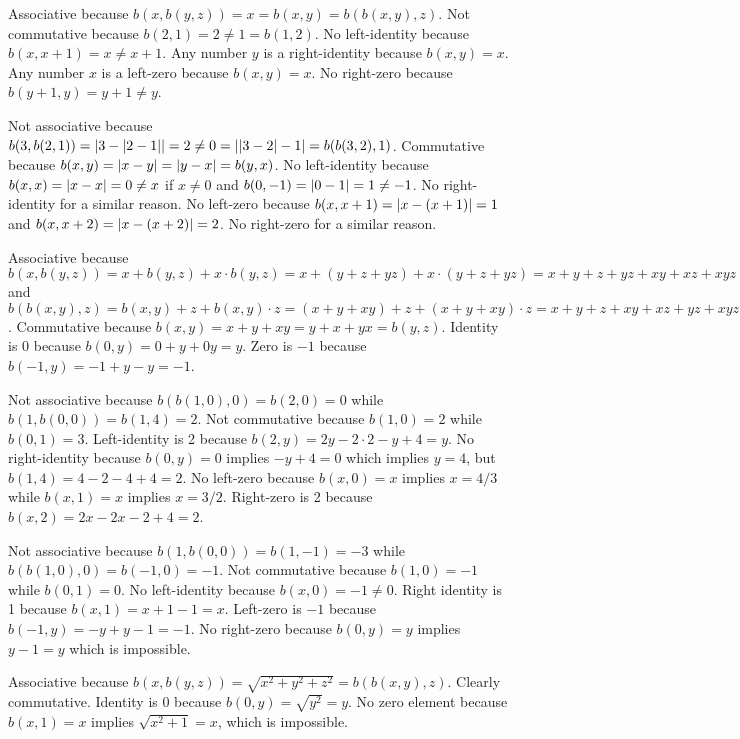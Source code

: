 \begin{solution}
\begin{enumalpha}
    \item Associative because $b(x,b(y,z))=x=b(x,y)=b(b(x,y),z)$.
    Not commutative because $b(2,1)=2\neq 1=b(1,2)$.
    No left-identity because $b(x,x+1)=x\neq x+1$.
    Any number $y$ is a right-identity because $b(x,y)=x$.
    Any number $x$ is a left-zero because $b(x,y)=x$.
    No right-zero because $b(y+1,y)=y+1\neq y$.

    \item Not associative because $b(3,b(2,1)) = \left\lvert3-\left\lvert2-1\right\rvert\right\rvert=2\neq0=\left\lvert\left\lvert3-2\right\rvert-1\right\rvert=b(b(3,2),1)$.
    Commutative because $b(x,y)=\left\lvert x-y\right\rvert=\left\lvert y-x\right\rvert=b(y,x)$.
    No left-identity because $b(x,x)=\left\lvert x-x\right\rvert=0\neq x$ if $x\neq 0$ and $b(0,-1)=\left\lvert0-1\right\rvert=1\neq -1$.
    No right-identity for a similar reason.
    No left-zero because $b(x,x+1)=\left\lvert x-(x+1)\right\rvert=1$ and $b(x,x+2)=\left\lvert x-(x+2)\right\rvert=2$.
    No right-zero for a similar reason.

    \item Associative because $b(x,b(y,z))=x+b(y,z)+x\cdot b(y,z)=x+(y+z+yz)+x\cdot(y+z+yz)
    =x+y+z+yz+xy+xz+xyz$ and $b(b(x,y),z)=b(x,y) + z + b(x,y)\cdot z=(x+y+xy) + z + (x+y+xy)\cdot z
    =x + y + z + xy + xz + yz + xyz$.
    Commutative because $b(x,y)=x+y+xy=y+x+yx=b(y,z)$.
    Identity is 0 because $b(0,y)=0+y+0y=y$.
    Zero is $-1$ because $b(-1,y)=-1+y-y=-1$.

    \item Not associative because $b(b(1,0),0)=b(2,0)=0$ while $b(1,b(0,0))
    =b(1,4)=2$.
    Not commutative because $b(1,0)=2$ while $b(0,1)=3$.
    Left-identity is 2 because $b(2,y)=2y-2\cdot 2 - y + 4 = y$.
    No right-identity because $b(0,y)=0$ implies $-y+4=0$ which implies $y=4$, but $b(1,4)=4-2-4+4=2$.
    No left-zero because $b(x,0)=x$ implies $x=4/3$ while $b(x,1)=x$ implies $x=3/2$.
    Right-zero is 2 because $b(x,2)=2x-2x-2+4=2$.

    \item Not associative because $b(1,b(0,0))=b(1,-1)=-3$ while $b(b(1,0),0)=b(-1,0)=-1$.
    Not commutative because $b(1,0)=-1$ while $b(0,1)=0$.
    No left-identity because $b(x,0)=-1\neq 0$.
    Right identity is 1 because $b(x,1)=x+1-1=x$.
    Left-zero is $-1$ because $b(-1,y)=-y+y-1=-1$.
    No right-zero because $b(0,y)=y$ implies $y-1=y$ which is impossible.

    \item Associative because
    $b(x,b(y,z))=\sqrt{x^2+y^2+z^2}=b(b(x,y),z)$.
    Clearly commutative.
    Identity is 0 because $b(0,y)=\sqrt{y^2}=y$.
    No zero element because $b(x,1)=x$ implies $\sqrt{x^2+1}=x$, which is impossible.


\end{enumalpha}
\end{solution}
